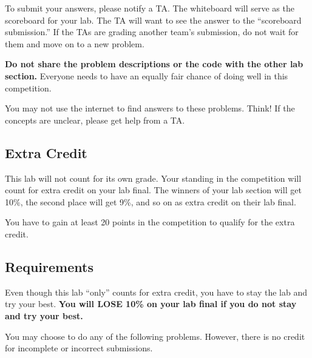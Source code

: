 \documentclass[11pt]{cselabheader}
\theoremstyle{plain}
\begin{document}

To submit your answers, please notify a TA. The whiteboard will serve as the
scoreboard for your lab. The TA will want to see the answer to the ``scoreboard
submission.'' If the TAs are grading another team's submission, do not wait for
them and move on to a new problem.

\textbf{Do not share the problem descriptions or the code with the other lab
section.} Everyone needs to have an equally fair chance of doing well in this
competition.

You may not use the internet to find answers to these problems. Think! If the
concepts are unclear, please get help from a TA.

\subsection{Extra Credit}
This lab will not count for its own grade. Your standing in the competition 
will count for extra credit on your lab final.
The winners of your lab section will get 10\%, the second place will get
9\%, and so on as extra credit on their lab final. 

You have to gain at least 20 points in the competition to qualify for the extra
credit. 

\subsection{Requirements}
Even though this lab ``only'' counts for extra credit, you have to stay the lab
and try your best. \textbf{You will LOSE 10\% on your lab final if you do not
stay and try your best.}

You may choose to do any of the following problems. However, there is no credit
for incomplete or incorrect submissions.

\end{document}
